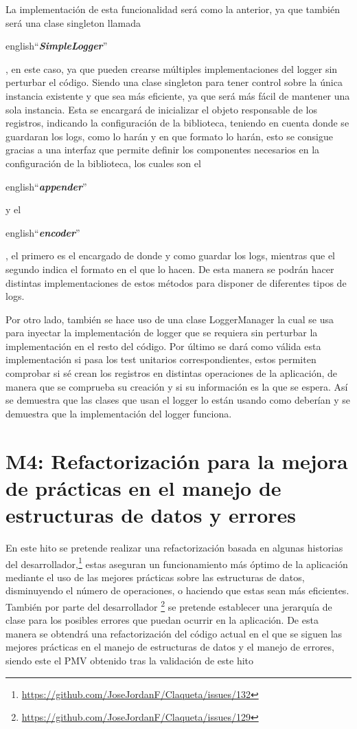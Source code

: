 La implementación de esta funcionalidad será como la anterior, ya que también será una clase singleton 
\cite{DPatterns} llamada \begin{otherlanguage} {english}``\textit{\textbf{SimpleLogger}}''\end{otherlanguage}, en 
este caso, ya que pueden crearse múltiples implementaciones del logger sin perturbar el código. Siendo una clase 
singleton para tener control sobre la única instancia existente y que sea más eficiente, ya que será más fácil de 
mantener una sola instancia. Esta se encargará de inicializar el objeto responsable de los registros, indicando la 
configuración de la biblioteca, teniendo en cuenta donde se guardaran los logs, como lo harán y en que formato lo 
harán, esto se consigue gracias a una interfaz que permite definir los componentes necesarios en la configuración de 
la biblioteca, los cuales son el \begin{otherlanguage} {english}``\textit{\textbf{appender}}''\end{otherlanguage} y 
el \begin{otherlanguage} {english}``\textit{\textbf{encoder}}''\end{otherlanguage}, el primero es el encargado de 
donde y como guardar los logs, mientras que el segundo indica el formato en el que lo hacen. De esta manera se podrán 
hacer distintas implementaciones de estos métodos para disponer de diferentes tipos de logs.

Por otro lado, también se hace uso de una clase LoggerManager la cual se usa para inyectar la implementación de 
logger que se requiera sin perturbar la implementación en el resto del código. Por último se dará como válida esta
implementación si pasa los test unitarios correspondientes, estos permiten comprobar si sé crean los registros en 
distintas operaciones de la aplicación, de manera que se comprueba su creación y si su información es la que se 
espera. Así se demuestra que las clases que usan el logger lo están usando como deberían y se demuestra que la 
implementación del logger funciona. 

\section{M4: Refactorización para la mejora de prácticas en el manejo de estructuras de datos y errores}

En este hito se pretende realizar una refactorización basada en algunas historias del 
desarrollador,\footnote{\url{https://github.com/JoseJordanF/Claqueta/issues/132}}
estas aseguran un funcionamiento más óptimo de la aplicación mediante el uso de las mejores prácticas sobre las 
estructuras de datos, disminuyendo el número de operaciones, o haciendo que estas sean más eficientes. También por 
parte del desarrollador \footnote{\url{https://github.com/JoseJordanF/Claqueta/issues/129}} se pretende establecer una 
jerarquía de clase para los posibles errores que puedan ocurrir en la aplicación. De esta manera se obtendrá una 
refactorización del código actual en el que se siguen las mejores prácticas en el manejo de estructuras de datos y el 
manejo de errores, siendo este el PMV obtenido tras la validación de este hito

